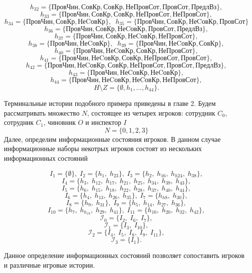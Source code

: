 $$	h_{32} = \{\text{ПровЧин}, \text{СовКр}, \text{СовКр}, \text{НеПровСот}, \text{ПровСот}, \text{ПредлВз}\}, $$
$$	h_{33} = \{\text{ПровЧин}, \text{СовКр}, \text{СовКр}, \text{НеПровСот}, \text{НеПровСот}\}, $$
$$	h_{34} = \{\text{ПровЧин}, \text{СовКр}, \text{НеCовКр}\},\;\;h_{35} = \{\text{ПровЧин}, \text{СовКр}, \text{НеCовКр}, \text{ПровСот}\} $$
$$	h_{36} = \{\text{ПровЧин}, \text{СовКр}, \text{НеCовКр}, \text{ПровСот}, \text{ПредлВз}\}, $$
$$	h_{37} = \{\text{ПровЧин}, \text{СовКр}, \text{НеCовКр}, \text{НеПровСот}\}, $$
$$	h_{38} = \{\text{ПровЧин}, \text{НеCовКр}\},\;\;h_{39} = \{\text{ПровЧин}, \text{НеCовКр}, \text{СовКр}\}, $$
$$	h_{40} = \{\text{ПровЧин}, \text{НеCовКр}, \text{СовКр}, \text{НеПровСот}\}, $$
$$	h_{41} = \{\text{ПровЧин}, \text{НеCовКр}, \text{СовКр}, \text{НеПровСот}, \text{ПровСот}\}, $$
$$	h_{42} = \{\text{ПровЧин}, \text{НеCовКр}, \text{СовКр}, \text{НеПровСот}, \text{ПровСот}, \text{ПредлВз}\}, $$
$$	h_{43} = \{\text{ПровЧин}, \text{НеCовКр}, \text{НеCовКр}\}, $$
$$	h_{44} = \{\text{ПровЧин}, \text{НеCовКр}, \text{НеCовКр}, \text{НеПровСот}\}, $$
\begin{equation}
	\label{HmZ2}
	H \setminus Z = \{\emptyset, h_{1}, \dots , h_{44}\}.
\end{equation}

\par
Терминальные истории подобного примера приведены в главе 2. Будем рассматривать множество $N$, состоящее из четырех игроков: сотрудник $C_0$, сотрудник $C_1$, чиновник $O$ и инспектор $I$
\begin{equation*}
	N = \{0, 1, 2, 3\}
\end{equation*}
Далее, определим информационные состояния игроков. В данном случае информационные наборы некотрых игроков состоят из нескольких информационных состояний

 $$	I_1 = \{\emptyset\},\; I_2 = \{h_{1},\; h_{23}\},\;	I_3 = \{h_{2},\; h_{16},\; h_{h24},\; h_{38}\},  $$
 $$	I_4 = \{h_{3},\;h_{12},\;h_{17},\;h_{21},\;h_{25},\;h_{34},\;h_{39},\;h_{43}\}, $$
 $$	I_5 = \{h_{6},\;h_{15},\;h_{18},\;h_{22},\;h_{28},\;h_{37},\;h_{40},\;h_{44}\}, $$
 $$	I_6 = \{h_{4},\;h_{13},\;h_{26},\;h_{35}\},\; I_7 = \{h_{h8},\; h_{30}\},$$
 $$	I_8 = \{h_{9},\;h_{31}\},\;I_9 = \{h_{5},\;h_{14},\;h_{27},\;h_{36}\},  $$
 $$	I_{10} = \{h_{7},\;h_{h_19},\;h_{29},\;h_{41}\},\;I_{11} = \{h_{10},\;h_{20},\;h_{32},\;h_{42}\}, $$
 $$	\mathcal{I}_0 = \{I_2,\;I_6,\;I_7\},  $$
 $$	\mathcal{I}_1 = \{I_3,\;I_{10}\},  $$
 $$	\mathcal{I}_2 = \{I_4,\;I_5,\;I_8,\;I_9,\;I_{11}\},  $$
 $$	\mathcal{I}_3 = \{I_1\}. $$
\par
Данное определение информационных состояний позволяет сопоставить игроков и различные игровые истории.


